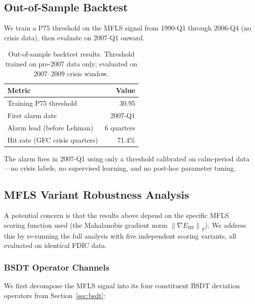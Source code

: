 \documentclass[11pt]{article}
\theoremstyle{definition}
\newcommand{\grad}{\nabla}
\newcommand{\Ebs}{E_{\mathrm{BS}}}
\newcommand{\norm}[1]{\left\|#1\right\|}
\begin{document}
\subsection{Out-of-Sample Backtest}
\label{sec:oos}

We train a P75 threshold on the MFLS signal from 1990-Q1 through 2006-Q4
(no crisis data), then evaluate on 2007-Q1 onward.

\begin{table}[htbp]
\centering
\caption{Out-of-sample backtest results.  Threshold trained on
pre-2007 data only; evaluated on 2007--2009 crisis window.}
\label{tab:oos}
\begin{tabular}{lr}
\toprule
Metric & Value \\
\midrule
Training P75 threshold & 30.95 \\
First alarm date & 2007-Q1 \\
Alarm lead (before Lehman) & 6 quarters \\
Hit rate (GFC crisis quarters) & 71.4\% \\
\bottomrule
\end{tabular}
\end{table}

\noindent The alarm fires in 2007-Q1 using only a threshold calibrated on
calm-period data---no crisis labels, no supervised learning, and no
post-hoc parameter tuning.

\subsection{MFLS Variant Robustness Analysis}
\label{sec:variants}

A potential concern is that the results above depend on the specific
MFLS scoring function used (the Mahalanobis gradient norm
$\norm{\grad\Ebs}_F$).  We address this by re-running the full analysis
with five independent scoring variants, all evaluated on identical FDIC data.

\subsubsection{BSDT Operator Channels}

We first decompose the MFLS signal into its four constituent BSDT
deviation operators from Section~\ref{sec:bsdt}:
\end{document}
